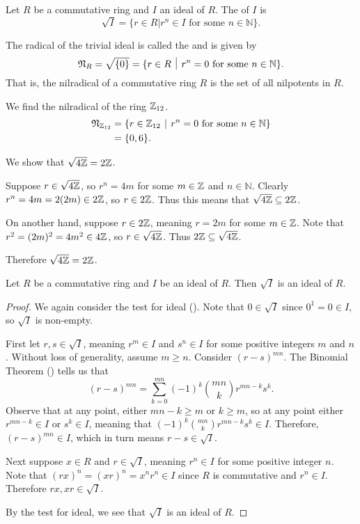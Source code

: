 \begin{definition}
    Let $R$ be a commutative ring and $I$ an ideal of $R$. The  of $I$ is
    \[
        \sqrt I = \{r \in R \vert r^n \in I \text{ for some } n \in \mathbb{N}\}.
    \]
\end{definition}
\begin{definition}
    The radical of the trivial ideal is called the  and is given by
    \[
        \Nilr{R} = \sqrt{\{0\}} = \{r \in R \vert r^n = 0 \text{ for some } n \in \mathbb{N}\}.
    \]
    That is, the nilradical of a commutative ring $R$ is the set of all nilpotents in $R$.
\end{definition}
\begin{example}
    We find the nilradical of the ring $\mathbb{Z}_{12}$.
    \begin{align*}
        \Nilr{\Z_{12}} &= \{r \in \Z_{12} \vert r^n = 0 \text{ for some } n \in \mathbb{N}\}\\
        &= \{0, 6\}.
    \end{align*}
\end{example}
\begin{example}
    We show that $\sqrt{4\mathbb{Z}} = 2\mathbb{Z}$.

    Suppose $r \in \sqrt{4\mathbb{Z}}$, so $r^n = 4m$ for some $m \in \mathbb{Z}$ and $n \in \mathbb{N}$. Clearly $r^n = 4m = 2(2m) \in 2\mathbb{Z}$, so $r \in 2\mathbb{Z}$. Thus this means that $\sqrt{4\mathbb{Z}} \subseteq 2\mathbb{Z}$.

    On another hand, suppose $r \in 2\mathbb{Z}$, meaning $r = 2m$ for some $m \in \mathbb{Z}$. Note that $r^2 = (2m)^2 = 4m^2 \in 4\mathbb{Z}$, so $r \in \sqrt{4\mathbb{Z}}$. Thus $2\mathbb{Z} \subseteq \sqrt{4\mathbb{Z}}$.

    Therefore $\sqrt{4\mathbb{Z}} = 2\mathbb{Z}$.
\end{example}

\begin{proposition}
    Let $R$ be a commutative ring and $I$ be an ideal of $R$. Then $\sqrt{I}$ is an ideal of $R$.
\end{proposition}
\begin{proof}
    We again consider the test for ideal (). Note that $0 \in \sqrt{I}$ since $0^1 = 0 \in I$, so $\sqrt{I}$ is non-empty.

    First let $r, s \in \sqrt{I}$, meaning $r^m \in I$ and $s^n \in I$ for some positive integers $m$ and $n$. Without loss of generality, assume $m \geq n$. Consider $(r-s)^{mn}$. The Binomial Theorem () tells us that
    \[
        (r-s)^{mn} = \sum_{k=0}^{mn}(-1)^k{mn \choose k}r^{mn-k}s^k.
    \]
    Observe that at any point, either $mn - k \geq m$ or $k \geq m$, so at any point either $r^{mn-k} \in I$ or $s^k \in I$, meaning that $(-1)^k{mn \choose k}r^{mn-k}s^k \in I$. Therefore, $(r-s)^{mn} \in I$, which in turn means $r-s \in \sqrt{I}$.

    Next suppose $x \in R$ and $r \in \sqrt{I}$, meaning $r^n \in I$ for some positive integer $n$. Note that $(rx)^n = (xr)^n = x^nr^n \in I$ since $R$ is commutative and $r^n \in I$. Therefore $rx, xr \in \sqrt{I}$.

    By the test for ideal, we see that $\sqrt{I}$ is an ideal of $R$.
\end{proof}


